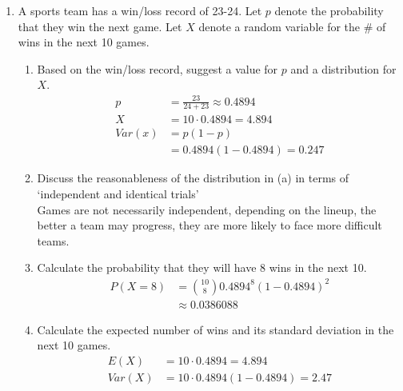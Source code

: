 \documentclass{article}
\begin{document}
\begin{enumerate}
    \item A sports team has a win/loss record of 23-24. Let \(p\) denote the probability that they win the next game. Let \(X\) denote a random variable for the \# of wins in the next 10 games.
          \begin{enumerate}[label = \alph*)]
              \item Based on the win/loss record, suggest a value for \(p\) and a distribution for \(X\).
                    \begin{align*}
                        p      & = \frac{23}{24 + 23} \approx 0.4894 \\
                        X      & = 10 \cdot 0.4894 = 4.894           \\
                        Var(x) & = p(1 - p)                          \\
                               & = 0.4894(1 - 0.4894) = 0.247
                    \end{align*}
              \item Discuss the reasonableness of the distribution in (a) in terms of `independent and identical trials' \\
                    Games are not necessarily independent, depending on the lineup, the better a team may progress, they are more likely to face more difficult teams.
              \item Calculate the probability that they will have 8 wins in the next 10.
                    \begin{align*}
                        P(X = 8) & = \binom{10}{8}0.4894^8(1 - 0.4894)^2 \\
                                 & \approx 0.0386088
                    \end{align*}
              \item Calculate the expected number of wins and its standard deviation in the next 10 games.
                    \begin{align*}
                        E(X)   & = 10 \cdot 0.4894 = 4.894            \\
                        Var(X) & = 10 \cdot 0.4894(1 - 0.4894) = 2.47
                    \end{align*}
          \end{enumerate}
\end{enumerate}
\end{document}
